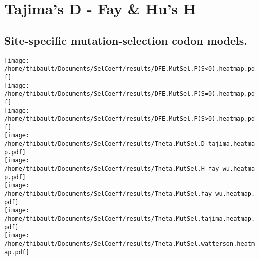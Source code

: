 \section{Tajima's D - Fay \& Hu's H} 
 
\subsection{Site-specific mutation-selection codon models.} 
\begin{center}
\texttt{[image: /home/thibault/Documents/SelCoeff/results/DFE.MutSel.P(S<0).heatmap.pdf]} \\
\texttt{[image: /home/thibault/Documents/SelCoeff/results/DFE.MutSel.P(S=0).heatmap.pdf]} \\
\texttt{[image: /home/thibault/Documents/SelCoeff/results/DFE.MutSel.P(S>0).heatmap.pdf]} \\
\texttt{[image: /home/thibault/Documents/SelCoeff/results/Theta.MutSel.D\_tajima.heatmap.pdf]} \\
\texttt{[image: /home/thibault/Documents/SelCoeff/results/Theta.MutSel.H\_fay\_wu.heatmap.pdf]} \\
\texttt{[image: /home/thibault/Documents/SelCoeff/results/Theta.MutSel.fay\_wu.heatmap.pdf]} \\
\texttt{[image: /home/thibault/Documents/SelCoeff/results/Theta.MutSel.tajima.heatmap.pdf]} \\
\texttt{[image: /home/thibault/Documents/SelCoeff/results/Theta.MutSel.watterson.heatmap.pdf]} \\
\end{center}
